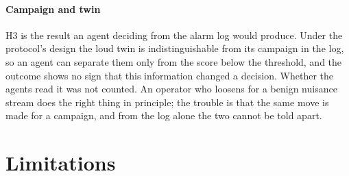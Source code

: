\documentclass[sigconf]{acmart}
\begin{document}
\paragraph{Campaign and twin}
H3 is the result an agent deciding from the alarm log would produce. Under the protocol's design the loud
twin is indistinguishable from its campaign in the log, so an agent can separate them only from the score
below the threshold, and the outcome shows no sign that this information changed a decision. Whether the
agents read it was not counted. An operator who loosens for a benign
nuisance stream does the right thing in principle; the trouble is that the same move is made for a
campaign, and from the log alone the two cannot be told apart.

\section{Limitations}
\label{sec:limitations}
\end{document}
